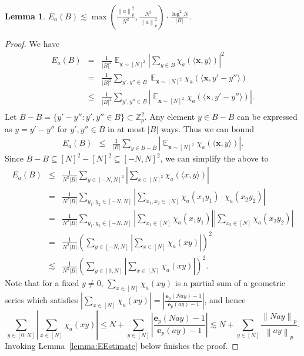 \documentclass[11pt]{article}
\numberwithin{equation}{section}
\newtheorem{lemma}[theorem]{Lemma}
\theoremstyle{definition}
\theoremstyle{plain}
\newcommand{\Z}{\mathbb Z}
\theoremstyle{definition}\newtheorem{problem}[theorem]{Problem}\theoremstyle{plain}
\DeclareMathOperator{\Ex}{{\mathbb E}}
\newcommand{\e}{\mathbf{e}}
\newcommand{\x}{\mathbf{x}}
\newcommand{\ip}[1]{\langle #1 \rangle}
\newcommand{\norm}[1]{\left\| #1 \right\|_p}
\begin{document}
 \begin{lemma}
 \label{lemma:prodset}
	 $  E_a(B) \lesssim \max\left(\frac{\norm{a}^2}{N^2},\frac{N^2}{\norm{a}^2}\right) \cdot \frac{ \log^2 N}{|B|}$.
 \end{lemma}
 \begin{proof}
 We have
\begin{eqnarray*}
E_a(B)  &=&  \frac{1}{|B|^2} \Ex_{\x \sim [N]^2}  \left|\sum_{y \in B} \chi_a(\ip{\x,y })\right|^2 \\
&=&   \frac{1}{|B|^2} \sum_{y', y'' \in B}  \Ex_{\x \sim [N]^2} \chi_a(\ip{\x,y'-y'' })  \\
&\le&   \frac{1}{|B|^2}   \sum_{y', y'' \in B}\left| \Ex_{\x \sim [N]^2}  \chi_a(\ip{\x, y'-y''}) \right|. \\
\end{eqnarray*}
Let $B-B=\{y'-y'': y',y'' \in B\} \subset \Z_p^2$. Any element $y \in B-B$ can be expressed as $y=y'-y''$ for $y',y'' \in B$ in at most $|B|$ ways. Thus we can bound
\begin{eqnarray*}
E_a(B)
&\le &   \frac{1}{|B|}  \sum_{y \in B-B} \left| \Ex_{\x \sim [N]^2}  \chi_a(\ip{\x, y}) \right|.
\end{eqnarray*}
Since $B-B \subseteq [N]^2-[N]^2   \subseteq [-N,N]^2$, we can simplify the above  to
%
\begin{eqnarray*}
E_a(B)    &\le&   \frac{1}{N^2 |B|} \sum_{y \in [-N,N]^2}  \left| \sum_{x \in [N]^2}  \chi_a(\ip{x, y}) \right|\\
&=& \frac{1}{N^2|B|} \sum_{y_1,y_2 \in [-N,N]}  \left|\sum_{x_1,x_2 \in [N]}   \chi_a( x_1y_1 )\cdot \chi_a( x_2y_2 ) \right|  \\
	&=&   \frac{1}{N^2|B|} \sum_{y_1,y_2 \in [-N,N]}  \left|  \sum_{x_1 \in [N]}   \chi_a( x_1 y_1 ) \right|\left|  \sum_{x_2 \in [N]}   \chi_a( x_2 y_2 ) \right|    \\
	&=&  \frac{1}{N^2|B|} \left( \sum_{y \in [-N,N]}  \left|\sum_{x \in [N]}  \chi_a(xy) \right| \right)^2 \\
	& \lesssim &  \frac{1}{N^2|B|} \left(\sum_{y \in [0,N]}  \left|\sum_{x \in [N]}  \chi_a(xy) \right| \right)^2.
\end{eqnarray*}
	Note that for a fixed $y\neq 0$, $\sum_{x \in [N]}  \chi_a(xy)$ is a partial sum of a geometric series which satisfies $\left| \sum_{x \in [N]}  \chi_a(xy) \right|= \left| \frac{\e_p(N a y)-1}{\e_p(ay)-1} \right|$, and hence
	$$  \sum_{y \in [0,N]}  \left|\sum_{x \in [N]}  \chi_a(xy) \right| \le N +  \sum_{y \in [N]}  \left| \frac{\e_p(N ay)-1}{\e_p(ay)-1} \right|\lesssim  N+\sum_{y \in [N]} \frac{\norm{Nay}}{\norm{ay}}.  $$
Invoking Lemma~\ref{lemma:EEstimate} below  finishes the proof.
\end{proof}
\end{document}

